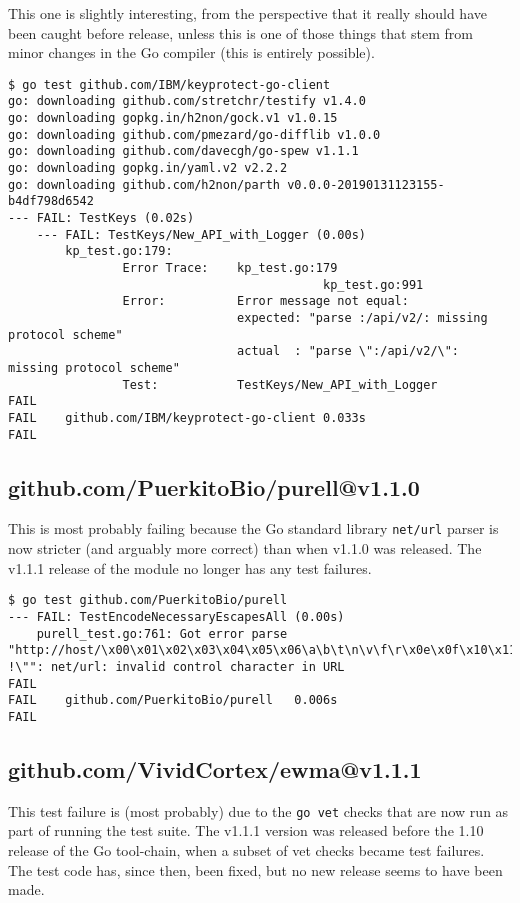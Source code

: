 \documentclass[a4paper]{paper}
\begin{document}
This one is slightly interesting, from the perspective that it really
should have been caught before release, unless this is one of those
things that stem from minor changes in the Go compiler (this is
entirely possible).

\begin{verbatim}
$ go test github.com/IBM/keyprotect-go-client       
go: downloading github.com/stretchr/testify v1.4.0
go: downloading gopkg.in/h2non/gock.v1 v1.0.15
go: downloading github.com/pmezard/go-difflib v1.0.0
go: downloading github.com/davecgh/go-spew v1.1.1
go: downloading gopkg.in/yaml.v2 v2.2.2
go: downloading github.com/h2non/parth v0.0.0-20190131123155-b4df798d6542
--- FAIL: TestKeys (0.02s)
    --- FAIL: TestKeys/New_API_with_Logger (0.00s)
        kp_test.go:179: 
            	Error Trace:	kp_test.go:179
            	            				kp_test.go:991
            	Error:      	Error message not equal:
            	            	expected: "parse :/api/v2/: missing protocol scheme"
            	            	actual  : "parse \":/api/v2/\": missing protocol scheme"
            	Test:       	TestKeys/New_API_with_Logger
FAIL
FAIL	github.com/IBM/keyprotect-go-client	0.033s
FAIL
\end{verbatim}

\subsection{github.com/PuerkitoBio/purell@v1.1.0}

This is most probably failing because the Go standard library {\tt net/url}
parser is now stricter (and arguably more correct) than when v1.1.0
was released. The v1.1.1 release of the module no longer has any test
failures.

\begin{verbatim}
$ go test github.com/PuerkitoBio/purell       
--- FAIL: TestEncodeNecessaryEscapesAll (0.00s)
    purell_test.go:761: Got error parse "http://host/\x00\x01\x02\x03\x04\x05\x06\a\b\t\n\v\f\r\x0e\x0f\x10\x11\x12\x13\x14\x15\x16\x17\x18\x19\x1a\x1b\x1c\x1d\x1e\x1f !\"": net/url: invalid control character in URL
FAIL
FAIL	github.com/PuerkitoBio/purell	0.006s
FAIL
\end{verbatim}

\subsection{github.com/VividCortex/ewma@v1.1.1}

This test failure is (most probably) due to the {\tt go vet} checks
that are now run as part of running the test suite. The v1.1.1 version
was released before the 1.10 release of the Go tool-chain, when a
subset of vet checks became test failures. The test code has, since
then, been fixed, but no new release seems to have been made.
\end{document}
